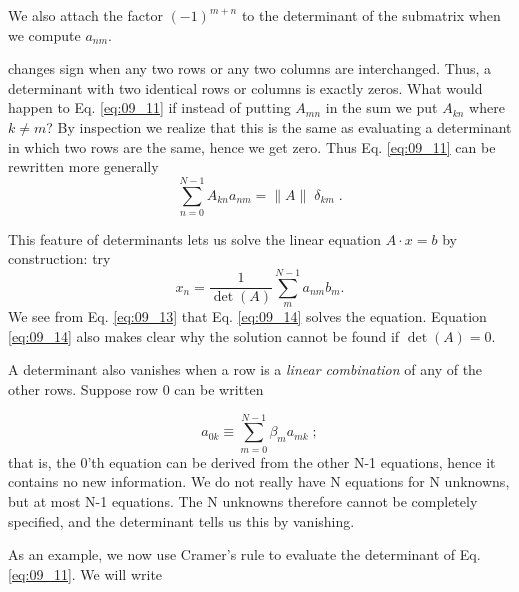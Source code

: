 We also attach the factor $(-1)^{m+n}$ to the determinant of the
submatrix when we compute $a_{nm}$.

 changes sign when any two rows or any two 
columns are interchanged. Thus, a determinant with two identical rows or
columns is exactly zeros. What would happen to
Eq. \ref{eq:09_11} if instead of putting $A_{mn}$ in the sum we put $A_{kn}$ where
$k\neq m$? By inspection we realize that this is the same as evaluating
a determinant in which two rows are the same, hence we get zero.
Thus Eq. \ref{eq:09_11} can be rewritten more generally
\begin{equation}
    \sum_{n=0}^{N-1}A_{kn}a_{nm}=\lVert A\rVert\;\delta_{km}\;.\label{eq:09_13}
\end{equation}

This feature of determinants lets us solve the linear equation
$A \cdot x = b$ by construction: try
\begin{equation}
    x_n=\frac{1}{\det(A)}\sum_{m}^{N-1}a_{nm}b_m.\label{eq:09_14}
\end{equation}
We see from Eq. \ref{eq:09_13} that Eq. \ref{eq:09_14} solves the equation. Equation \ref{eq:09_14}
also makes clear why the solution cannot be found if $\det(A) = 0$.

A determinant also vanishes when a row is a \textit{linear combination}
of any of the other rows. Suppose row 0 can be written

\begin{equation*}
    a_{0k}\equiv    \sum_{m=0}^{N-1}\beta _m a_{mk}\;;
\end{equation*}
that is, the 0'th equation can be derived from the other N-1
equations, hence it contains no new information. We do not really
have N equations for N unknowns, but at most N-1 equations. The
N unknowns therefore cannot be completely specified, and the
determinant tells us this by vanishing.

As an example, we now use Cramer's rule to evaluate the determinant of Eq. \ref{eq:09_11}. We will write

